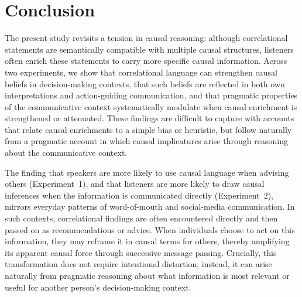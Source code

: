 \documentclass[10pt,letterpaper]{article}
\begin{document}
\section{Conclusion}

The present study revisits a tension in causal reasoning: although correlational statements are semantically compatible with multiple causal structures, listeners often enrich these statements to carry more specific causal information. Across two experiments, we show that correlational language can strengthen causal beliefs in decision-making contexts, that such beliefs are reflected in both own interpretations and action-guiding communication, and that pragmatic properties of the communicative context systematically modulate when causal enrichment is strengthened or attenuated. 
These findings are difficult to capture with accounts that relate causal enrichments to a simple bias or heuristic, but follow naturally from a pragmatic account in which causal implicatures arise through reasoning about the communicative context.


The finding that speakers are more likely to use causal language when advising others (Experiment~1), and that listeners are more likely to draw causal inferences when the information is communicated directly (Experiment~2), mirrors everyday patterns of word-of-mouth and social-media communication. In such contexts, correlational findings are often encountered directly and then passed on as recommendations or advice. When individuals choose to act on this information, they may reframe it in causal terms for others, thereby amplifying its apparent causal force through successive message passing. Crucially, this transformation does not require intentional distortion; instead, it can arise naturally from pragmatic reasoning about what information is most relevant or useful for another person’s decision-making context.
\end{document}
